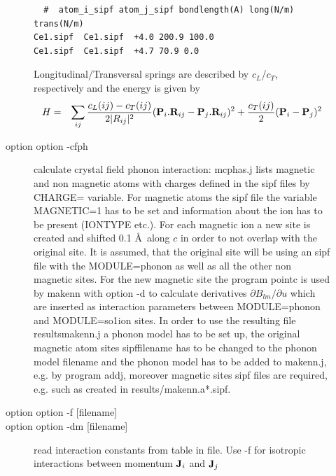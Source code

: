 \begin{description}
\begin{description}
             \begin{verbatim}  #  atom_i_sipf atom_j_sipf bondlength(A) long(N/m) trans(N/m) 
Ce1.sipf  Ce1.sipf  +4.0 200.9 100.0
Ce1.sipf  Ce1.sipf  +4.7 70.9 0.0
             \end{verbatim}
              Longitudinal/Transversal springs are described by $c_L$/$c_T$, respectively and
              the energy is given by
\begin{eqnarray}
 H &=& \sum_{ij} \frac{c_L(ij)-c_T(ij)}{2|\mbf \mbf R_{ij}|^2} (\mbf P_i . \mbf R_{ij}- \mbf P_j . \mbf R_{ij})^2 
       + \frac{c_T(ij)}{2} (\mbf P_i - \mbf P_j )^2 
\end{eqnarray}


\item[option {\prg  option -cfph }]
              calculate crystal field phonon interaction: {\prg mcphas.j} lists 
              magnetic and non magnetic atoms with charges defined in the 
              sipf files by {\prg CHARGE= variable}. For magnetic atoms the sipf 
              file the variable {\prg MAGNETIC=1} has to be set and information 
              about the ion has to be present ({\prg IONTYPE} etc.). 
              For each magnetic ion a new site is created and shifted
              0.1 \AA \ along $c$ in order to not overlap with the original site.
              It is assumed, that the original site will be using an sipf
              file with the {\prg MODULE=phonon} as well as all the other
              non magnetic sites. For the new magnetic site the program
              {\prg pointc} is used by {\prg makenn} with option -d to calculate derivatives
              $\partial B_{lm}/\partial u$ which are inserted as interaction 
              parameters between {\prg MODULE=phonon} and {\prg MODULE=so1ion} sites.
              In order to use the resulting file {\prg results\/makenn.j} a phonon
              model has to be set up, the original magnetic atom sites 
              {\prg sipffilename} has to be changed to the phonon model filename 
              and the phonon model has to be added to {\prg makenn.j},  e.g. by
              program {\prg addj}, moreover magnetic sites sipf files are required, 
              e.g. such as created in {\prg results\//makenn.a*.sipf}. 
\item[option {\prg  option -f [filename]}]
\item[option {\prg  option -dm [filename]}]
              read interaction constants from table in file. 
              Use -f for isotropic interactions between momentum $\mathbf J_i$ and $\mathbf J_j$

\end{description}
\end{description}
